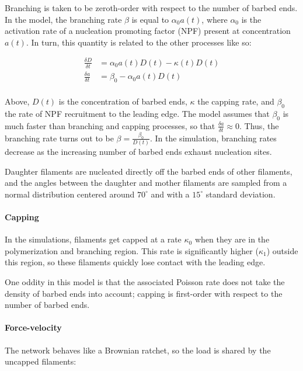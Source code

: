 \documentclass[11pt]{article}
\begin{document}
Branching is taken to be zeroth-order with respect to the number of
barbed ends. In the model, the branching rate \(\beta\) is equal to
\(\alpha_0 a(t)\), where \(\alpha_0\) is the activation rate of a
nucleation promoting factor (NPF) present at concentration \(a(t)\). In
turn, this quantity is related to the other processes like so:

\begin{align*}
\frac{\delta D}{\delta t} &= \alpha_0 a(t) D(t) - \kappa (t) D(t) \\
\frac{\delta a}{\delta t} &= \beta_0 - \alpha_0 a(t) D(t) \\
\end{align*}

Above, \(D(t)\) is the concentration of barbed ends, \(\kappa\) the
capping rate, and \(\beta_0\) the rate of NPF recruitment to the leading
edge. The model assumes that \(\beta_0\) is much faster than branching
and capping processes, so that \(\frac{\delta a}{\delta t} \approx 0\).
Thus, the branching rate turns out to be
\(\beta = \frac{\beta_0}{D(t)}\). In the simulation, branching rates
decrease as the increasing number of barbed ends exhaust nucleation
sites.

Daughter filaments are nucleated directly off the barbed ends of other
filaments, and the angles between the daughter and mother filaments are
sampled from a normal distribution centered around \(70^\circ\) and with
a \(15^\circ\) standard deviation.

\paragraph{Capping}\label{capping}

In the simulations, filaments get capped at a rate \(\kappa_0\) when
they are in the polymerization and branching region. This rate is
significantly higher (\(\kappa_1\)) outside this region, so these
filaments quickly lose contact with the leading edge.

One oddity in this model is that the associated Poisson rate does not
take the density of barbed ends into account; capping is first-order
with respect to the number of barbed ends.

\paragraph{Force-velocity}\label{force-velocity}

The network behaves like a Brownian ratchet, so the load is shared by
the uncapped filaments:
\end{document}

